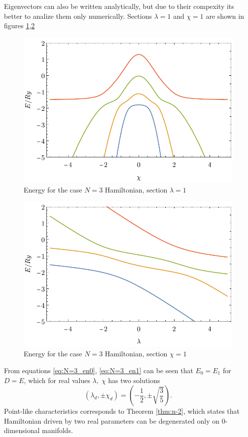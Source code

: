 Eigenvectors can also be written analytically, but due to their compexity its better to analize them only numerically. Sections $\lambda=1$ and $\chi=1$ are shown in figures \ref{fig:N=3_energiesl},\ref{fig:N=3_energiesc}
\begin{figure}[h]
    \centering
    \includegraphics{../img/N=3_energiesl.pdf}
    \caption{Energy for the case $N=3$ Hamiltonian, section $\lambda=1$}
    \label{fig:N=3_energiesl}
\end{figure}
\begin{figure}[h]
    \centering
    \includegraphics{../img/N=3_energiesc.pdf}
    \caption{Energy for the case $N=3$ Hamiltonian, section $\chi=1$}
    \label{fig:N=3_energiesc}
\end{figure}

From equations \ref{eq:N=3_en0}, \ref{eq:N=3_en1} can be seen that $E_0=E_1$ for $D=E$, which for real values $\lambda,\;\chi$ has two solutions
$$(\lambda_d,\pm \chi_d)=\left(-\frac{1}{2},\pm\sqrt{\frac{3}{5}}\right).$$
Point-like characteristics corresponds to Theorem \ref{thm:n-2}, which states that Hamiltonian driven by two real parameters can be degenerated only on 0-dimensional manifolds. 

